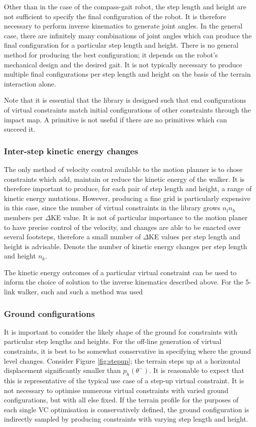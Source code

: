 Other than in the case of the compass-gait robot, the step length and height are not sufficient to specify the final configuration of the robot. It is therefore necessary to perform inverse kinematics to generate joint angles. In the general case, there are infinitely many combinations of joint angles which can produce the final configuration for a particular step length and height. There is no general method for producing the best configuration; it depends on the robot's mechanical design and the desired gait.  It is not typically necessary to produce multiple final configurations per step length and height on the basis of the terrain interaction alone.

Note that it is essential that the library is designed such that end configurations of virtual constraints match initial configurations of other constraints through the impact map. A primitive is not useful if there are no primitives which can succeed it.

\subsubsection{Inter-step kinetic energy changes}
The only method of velocity control available to the motion planner is to chose constraints which add, maintain or reduce the kinetic energy of the walker. It is therefore important to produce, for each pair of step length and height, a range of kinetic energy mutations. However, producing a fine grid is particularly expensive in this case, since the number of virtual constraints in the library grows $n_ln_h$ members per $\Delta$KE value. It is not of particular importance to the motion planer to have precise control of the velocity, and changes are able to be enacted over several footsteps, therefore a small number of $\Delta$KE values per step length and height is advisable. Denote the number of kinetic energy changes per step length and height $n_k$.

The kinetic energy outcomes of a particular virtual constraint can be used to inform the choice of solution to the inverse kinematics described above. {\color{orange} For the 5-link walker, such and such a method was used}

\subsubsection{Ground configurations}
It is important to consider the likely shape of the ground for constraints with particular step lengths and heights. For the off-line generation of virtual constraints, it is best to be somewhat conservative in specifying where the ground level changes. Consider Figure \ref{fig:stepup}; the terrain steps up at a horizontal displacement significantly smaller than $p_h(\theta^-)$. It is reasonable to expect that this is representative of the typical use case of a step-up virtual constraint. It is not necessary to optimise numerous virtual constraints with varied ground configurations, but with all else fixed. If the terrain profile for the purposes of each single VC optimisation is conservatively defined, the ground configuration is indirectly sampled by producing constraints with varying step length and height.

